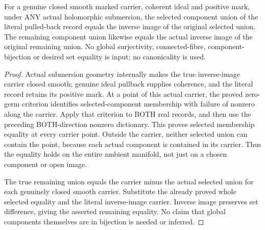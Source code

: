 \begin{theorem}
\label{hir:actual-contact-selected-remaining-smooth-preimage}
\leanok
For a genuine closed smooth marked carrier, coherent ideal and positive
mark, under ANY actual holomorphic submersion, the selected component
union of the literal pulled-back record equals the inverse image of the
original selected union. The remaining component union likewise equals
the actual inverse image of the original remaining union. No global
surjectivity, connected-fibre, component-bijection or desired set equality
is input; no canonicality is used.
\end{theorem}
\begin{proof}
Actual submersion geometry internally makes the true inverse-image carrier
closed smooth; genuine ideal pullback supplies coherence, and the literal
record retains its positive mark. At a point of this actual carrier, the
proved zero-germ criterion identifies selected-component membership with
failure of nonzero along the carrier. Apply that criterion to BOTH real
records, and then use the preceding BOTH-direction nonzero dictionary.
This proves selected membership equality at every carrier point. Outside
the carrier, neither selected union can contain the point, because each
actual component is contained in its carrier. Thus the equality holds on
the entire ambient manifold, not just on a chosen component or open image.

The true remaining union equals the carrier minus the actual selected
union for each genuinely closed smooth carrier. Substitute the already
proved whole selected equality and the literal inverse-image carrier.
Inverse image preserves set difference, giving the asserted remaining
equality. No claim that global components themselves are in bijection is
needed or inferred.
\end{proof}

